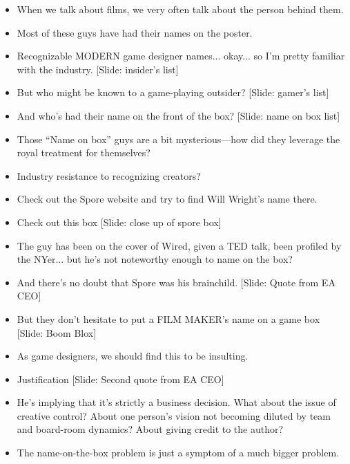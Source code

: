 \documentclass[12pt]{article}
\begin{document}
{\begin{itemize}
\item When we talk about films, we very often talk about the person behind them.
\item Most of these guys have had their names on the poster.

\item Recognizable MODERN game designer names...  okay... so I'm pretty familiar with the industry. [Slide:  insider's list]

\item But who might be known to a game-playing outsider?  [Slide: gamer's list]

\item And who's had their name on the front of the box? [Slide: name on box list]

\item Those ``Name on box'' guys are a bit mysterious---how did they leverage the royal treatment for themselves?

\item Industry resistance to recognizing creators?

\item Check out the Spore website and try to find Will Wright's name there.

\item Check out this box [Slide:  close up of spore box]

\item The guy has been on the cover of Wired, given a TED talk, been profiled by the NYer... but he's not noteworthy enough to name on the box?  

\item And there's no doubt that Spore was his brainchild.  [Slide:  Quote from EA CEO]

\item But they don't hesitate to put a FILM MAKER's name on a game box [Slide: Boom Blox]

\item As game designers, we should find this to be insulting.

\item Justification [Slide:  Second quote from EA CEO]

\item He's implying that it's strictly a business decision.  What about the issue of creative control?  About one person's vision not becoming diluted by team and board-room dynamics?  About giving credit to the author?

\item The name-on-the-box problem is just a symptom of a much bigger problem.


\end{itemize}}
\end{document}
